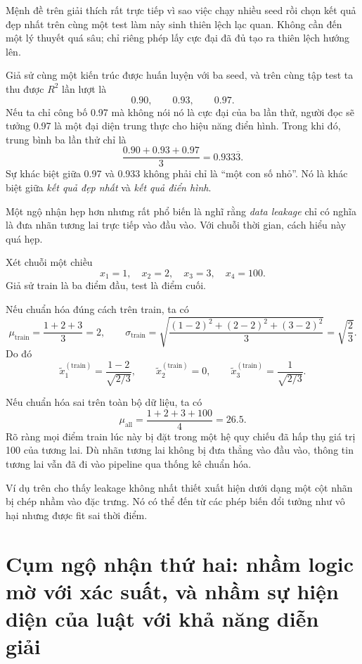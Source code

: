 Mệnh đề trên giải thích rất trực tiếp vì sao việc chạy nhiều seed rồi chọn kết quả đẹp nhất trên cùng một test làm nảy sinh thiên lệch lạc quan. Không cần đến một lý thuyết quá sâu; chỉ riêng phép lấy cực đại đã đủ tạo ra thiên lệch hướng lên.

\begin{example}
Giả sử cùng một kiến trúc được huấn luyện với ba seed, và trên cùng tập test ta thu được \(R^2\) lần lượt là
\[
0.90,\qquad 0.93,\qquad 0.97.
\]
Nếu ta chỉ công bố 0.97 mà không nói nó là cực đại của ba lần thử, người đọc sẽ tưởng 0.97 là một đại diện trung thực cho hiệu năng điển hình. Trong khi đó, trung bình ba lần thử chỉ là
\[
\frac{0.90+0.93+0.97}{3}=0.933\overline{3}.
\]
Sự khác biệt giữa 0.97 và 0.933 không phải chỉ là ``một con số nhỏ''. Nó là khác biệt giữa \emph{kết quả đẹp nhất} và \emph{kết quả điển hình}.
\end{example}

Một ngộ nhận hẹp hơn nhưng rất phổ biến là nghĩ rằng \emph{data leakage} chỉ có nghĩa là đưa nhãn tương lai trực tiếp vào đầu vào. Với chuỗi thời gian, cách hiểu này quá hẹp.

\begin{example}
Xét chuỗi một chiều
\[
x_1=1,\quad x_2=2,\quad x_3=3,\quad x_4=100.
\]
Giả sử train là ba điểm đầu, test là điểm cuối.

Nếu chuẩn hóa đúng cách trên train, ta có
\[
\mu_{\mathrm{train}}=\frac{1+2+3}{3}=2,\qquad
\sigma_{\mathrm{train}}=\sqrt{\frac{(1-2)^2+(2-2)^2+(3-2)^2}{3}}=\sqrt{\frac{2}{3}}.
\]
Do đó
\[
\widetilde x_1^{(\mathrm{train})}=\frac{1-2}{\sqrt{2/3}},\qquad
\widetilde x_2^{(\mathrm{train})}=0,\qquad
\widetilde x_3^{(\mathrm{train})}=\frac{1}{\sqrt{2/3}}.
\]

Nếu chuẩn hóa sai trên toàn bộ dữ liệu, ta có
\[
\mu_{\mathrm{all}}=\frac{1+2+3+100}{4}=26.5.
\]
Rõ ràng mọi điểm train lúc này bị đặt trong một hệ quy chiếu đã hấp thụ giá trị 100 của tương lai. Dù nhãn tương lai không bị đưa thẳng vào đầu vào, thông tin tương lai vẫn đã đi vào pipeline qua thống kê chuẩn hóa.
\end{example}

Ví dụ trên cho thấy leakage không nhất thiết xuất hiện dưới dạng một cột nhãn bị chép nhầm vào đặc trưng. Nó có thể đến từ các phép biến đổi tưởng như vô hại nhưng được fit sai thời điểm.

\section{Cụm ngộ nhận thứ hai: nhầm logic mờ với xác suất, và nhầm sự hiện diện của luật với khả năng diễn giải}

